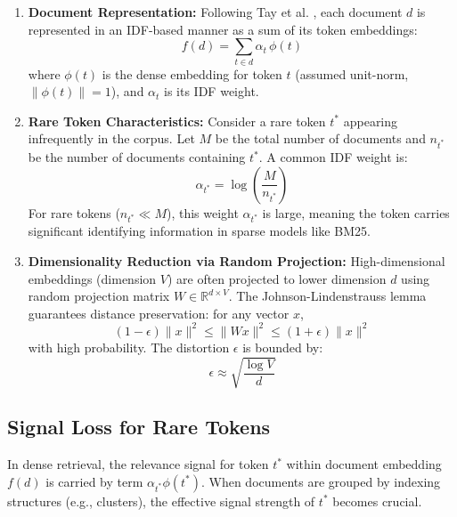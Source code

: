 \documentclass[conference,anonymous]{IEEEtran}
\begin{document}
\begin{enumerate}[label=(\arabic*)]
\item \textbf{Document Representation:} Following Tay et al. \cite{tay2020sparse}, each document $d$ is represented in an IDF-based manner as a sum of its token embeddings:
\begin{equation}
f(d) = \sum_{t\in d} \alpha_t\, \phi(t)
\label{eq:doc_rep}
\end{equation}
where $\phi(t)$ is the dense embedding for token $t$ (assumed unit-norm, $\|\phi(t)\| = 1$), and $\alpha_t$ is its IDF weight.

\item \textbf{Rare Token Characteristics:} Consider a rare token $t^*$ appearing infrequently in the corpus. Let $M$ be the total number of documents and $n_{t^*}$ be the number of documents containing $t^*$. A common IDF weight is:
\begin{equation}
\alpha_{t^*} = \log\!\left(\frac{M}{n_{t^*}}\right)
\label{eq:idf_weight}
\end{equation}
For rare tokens ($n_{t^*} \ll M$), this weight $\alpha_{t^*}$ is large, meaning the token carries significant identifying information in sparse models like BM25.

\item \textbf{Dimensionality Reduction via Random Projection:} High-dimensional embeddings (dimension $V$) are often projected to lower dimension $d$ using random projection matrix $W\in \mathbb{R}^{d\times V}$. The Johnson-Lindenstrauss lemma \cite{johnson1984extensions} guarantees distance preservation: for any vector $x$,
\begin{equation}
(1-\epsilon)\|x\|^2 \leq \|W x\|^2 \leq (1+\epsilon)\|x\|^2
\label{eq:jl_lemma}
\end{equation}
with high probability. The distortion $\epsilon$ is bounded by:
\begin{equation}
\epsilon \approx \sqrt{\frac{\log V}{d}}
\label{eq:jl_error_bound}
\end{equation}
\end{enumerate}

\subsection{Signal Loss for Rare Tokens}

In dense retrieval, the relevance signal for token $t^*$ within document embedding $f(d)$ is carried by term $\alpha_{t^*} \phi(t^*)$. When documents are grouped by indexing structures (e.g., clusters), the effective signal strength of $t^*$ becomes crucial.
\end{document}

